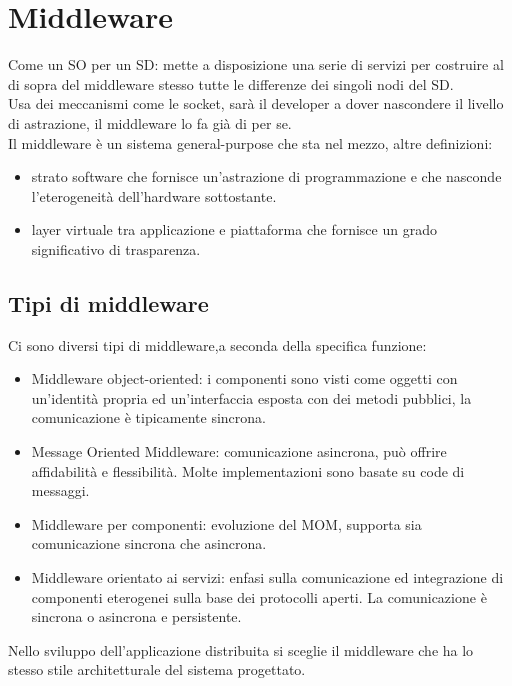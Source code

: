 \documentclass{article}
\begin{document}
\section{Middleware}
Come un SO per un SD: mette a disposizione una serie di servizi per costruire al di sopra del middleware stesso tutte le differenze dei singoli nodi del SD.\\ Usa dei meccanismi come le socket, sarà il developer a dover nascondere il livello di astrazione, il middleware lo fa già di per se.\\ Il middleware è un sistema general-purpose che sta nel mezzo, altre definizioni:
\begin{itemize}
\item strato software che fornisce un'astrazione di programmazione e che nasconde l'eterogeneità dell'hardware sottostante.
\item layer virtuale tra applicazione e piattaforma che fornisce un grado significativo di trasparenza.
\end{itemize}
\subsection{Tipi di middleware}
Ci sono diversi tipi di middleware,a seconda della specifica funzione:
\begin{itemize}
\item Middleware object-oriented: i componenti sono visti come oggetti con un'identità propria ed un'interfaccia esposta con dei metodi pubblici, la comunicazione è tipicamente sincrona.
\item Message Oriented Middleware: comunicazione asincrona, può offrire affidabilità e flessibilità. Molte implementazioni sono basate su code di messaggi.
\item Middleware per componenti: evoluzione del MOM, supporta sia comunicazione sincrona che asincrona.
\item Middleware orientato ai servizi: enfasi sulla comunicazione ed integrazione di componenti eterogenei sulla base dei protocolli aperti. La comunicazione è sincrona o asincrona e persistente.
\end{itemize}
Nello sviluppo dell'applicazione distribuita si sceglie il middleware che ha lo stesso stile architetturale del sistema progettato.
\end{document}
